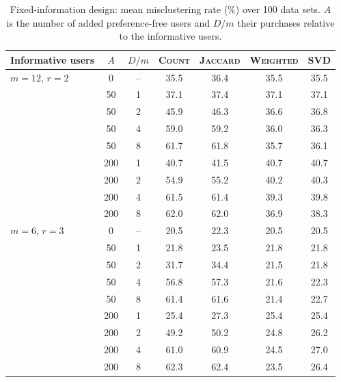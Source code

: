 \begin{table}[H]
\centering\small
\caption{Fixed-information design: mean misclustering rate (\%) over 100 data sets. $A$ is the number of added preference-free users and $D/m$ their purchases relative to the informative users.}
\label{tab:separation}
\begin{tabular}{@{}lcccccc@{}}
\toprule
Informative users & $A$ & $D/m$ & \textsc{Count} & \textsc{Jaccard} & \textsc{Weighted} & \textsc{SVD} \\
\midrule
$m=12$, $r=2$ & 0 & -- & 35.5 & 36.4 & 35.5 & 35.5 \\
 & 50 & 1 & 37.1 & 37.4 & 37.1 & 37.1 \\
 & 50 & 2 & 45.9 & 46.3 & 36.6 & 36.8 \\
 & 50 & 4 & 59.0 & 59.2 & 36.0 & 36.3 \\
 & 50 & 8 & 61.7 & 61.8 & 35.7 & 36.1 \\
 & 200 & 1 & 40.7 & 41.5 & 40.7 & 40.7 \\
 & 200 & 2 & 54.9 & 55.2 & 40.2 & 40.3 \\
 & 200 & 4 & 61.5 & 61.4 & 39.3 & 39.8 \\
 & 200 & 8 & 62.0 & 62.0 & 36.9 & 38.3 \\
\addlinespace
$m=6$, $r=3$ & 0 & -- & 20.5 & 22.3 & 20.5 & 20.5 \\
 & 50 & 1 & 21.8 & 23.5 & 21.8 & 21.8 \\
 & 50 & 2 & 31.7 & 34.4 & 21.5 & 21.8 \\
 & 50 & 4 & 56.8 & 57.3 & 21.6 & 22.3 \\
 & 50 & 8 & 61.4 & 61.6 & 21.4 & 22.7 \\
 & 200 & 1 & 25.4 & 27.3 & 25.4 & 25.4 \\
 & 200 & 2 & 49.2 & 50.2 & 24.8 & 26.2 \\
 & 200 & 4 & 61.0 & 60.9 & 24.5 & 27.0 \\
 & 200 & 8 & 62.3 & 62.4 & 23.5 & 26.4 \\
\bottomrule
\end{tabular}
\end{table}
